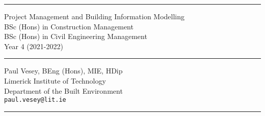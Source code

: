 
\thispagestyle{empty} %


\hrule

\vspace*{0.7cm} %


\begin{flushright}
\Huge Project Management and Building Information Modelling \\
\vspace*{0.7cm}
\Large BSc (Hons) in Construction Management\\
BSc (Hons) in Civil Engineering Management\\
Year 4 (2021-2022)
\end{flushright}

\vspace*{0.7cm} %
	
\normalsize

\hrule


\vfill %


{\centering \large 
\hfill Paul Vesey, \scriptsize BEng (Hons), MIE, HDip\normalsize \\
\hfill Limerick Institute of Technology \\
\hfill Department of the Built Environment \\
\hfill \texttt{paul.vesey@lit.ie} \\
\vspace*{0.7cm} 
\hrule} %


\clearpage %
